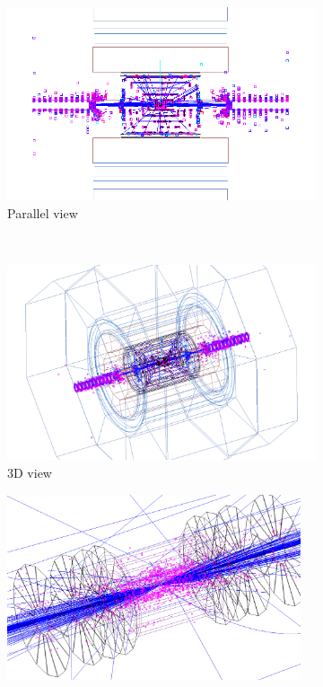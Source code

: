  \begin{figure}[!h]
 \centering
  \begin{subfigure}[b]{0.49\textwidth}
   \centering
    \includegraphics[width=\textwidth]{Figures/Pairs/Event_display_ILC500_rhoz_view_inverted.png}
   \caption{Parallel view}
   \end{subfigure}\\
    \begin{subfigure}[b]{0.43\textwidth}
   \centering
    \includegraphics[width=\textwidth]{Figures/Pairs/Event_display_ILC500_3D_view2_inverted.png}
   \caption{3D view}
   \end{subfigure}
   \hfill
    \begin{subfigure}[b]{0.43\textwidth}
   \centering
    \includegraphics[width=0.95\textwidth]{Figures/Pairs/Event_display_ILC500_vertex_3D_view2_inverted.png}

\end{subfigure}
\end{figure}
